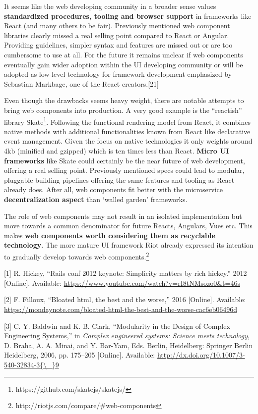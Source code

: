 \documentclass[]{article}
\begin{document}
It seems like the web developing community in a broader sense values
\textbf{standardized procedures, tooling and browser support} in
frameworks like React (and many others to be fair). Previously mentioned
web component libraries clearly missed a real selling point compared to
React or Angular. Providing guidelines, simpler syntax and features are
missed out or are too cumbersome to use at all. For the future it
remains unclear if web components eventually gain wider adoption within
the UI developing community or will be adopted as low-level technology
for framework development emphasized by Sebastian Markbage, one of the
React creators.{[}21{]}

Even though the drawbacks seems heavy weight, there are notable attempts
to bring web components into production. A very good example is the
``reactish'' library Skate\footnote{https://github.com/skatejs/skatejs/}.
Following the functional rendering model from React, it combines native
methods with additional functionalities known from React like
declarative event management. Given the focus on native technologies it
only weights around 4kb (minified and gzipped) which is ten times less
than React. \textbf{Micro UI frameworks} like Skate could certainly be
the near future of web development, offering a real selling point.
Previously mentioned specs could lead to modular, pluggable building
pipelines offering the same features and tooling as React already does.
After all, web components fit better with the microservice
\textbf{decentralization aspect} than `walled garden' frameworks.

The role of web components may not result in an isolated implementation
but move towards a common denominator for future Reacts, Angulars, Vues
etc. This makes \textbf{web components worth considering them as
recyclable technology}. The more mature UI framework Riot already
expressed its intention to gradually develop towards web
components.\footnote{http://riotjs.com/compare/\#web-components}

\hypertarget{refs}{}
\hypertarget{ref-Hickey2012}{}
{[}1{]} R. Hickey, ``Rails conf 2012 keynote: Simplicity matters by rich
hickey.'' 2012 {[}Online{]}. Available:
\url{https://www.youtube.com/watch?v=rI8tNMsozo0\&t=46s}

\hypertarget{ref-Filloux2016}{}
{[}2{]} F. Filloux, ``Bloated html, the best and the worse,'' 2016
{[}Online{]}. Available:
\url{https://mondaynote.com/bloated-html-the-best-and-the-worse-cac6eb06496d}

\hypertarget{ref-Baldwin2006}{}
{[}3{]} C. Y. Baldwin and K. B. Clark, ``Modularity in the Design of
Complex Engineering Systems,'' in \emph{Complex engineered systems:
Science meets technology}, D. Braha, A. A. Minai, and Y. Bar-Yam, Eds.
Berlin, Heidelberg: Springer Berlin Heidelberg, 2006, pp. 175--205
{[}Online{]}. Available:
\href{http://dx.doi.org/10.1007/3-540-32834-3\%7B/_\%7D9}{http://dx.doi.org/10.1007/3-540-32834-3\{\textbackslash{}\_\}9}
\end{document}
